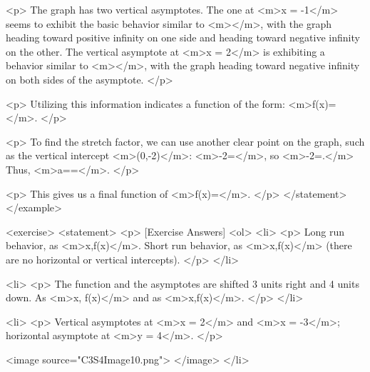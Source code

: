                 <p>
                    The graph has two vertical asymptotes.
                    The one at <m>x = -1</m> seems to exhibit the basic behavior similar to <m></m>, with the graph heading toward positive infinity on one side and heading toward negative infinity on the other.
                    The vertical asymptote at <m>x = 2</m> is exhibiting a behavior similar to <m></m>, with the graph heading toward negative infinity on both sides of the asymptote.
                </p>

                <p>
                    Utilizing this information indicates a function of the form: <m>f(x)=</m>.
                </p>

                <p>
                    To find the stretch factor, we can use another clear point on the graph, such as the vertical intercept <m>(0,-2)</m>: <m>-2=</m>, so <m>-2=.</m> Thus, <m>a==</m>.
                </p>

                <p>
                    This gives us a final function of <m>f(x)=</m>.
                </p>
            </statement>
        </example>

        <exercise>
            <statement>
                <p>
                    [Exercise Answers]
                    <ol>
                        <li>
                            <p>
                                Long run behavior, as <m>x\to \pm \infty,f(x)</m>.
                                Short run behavior, as <m>x,f(x)\to \infty</m> (there are no horizontal or vertical intercepts).
                            </p>
                        </li>

                        <li>
                            <p>
                                The function and the asymptotes are shifted 3 units right and 4 units down.
                                As <m>x, f(x)\to \infty</m> and as <m>x\to \pm \infty,f(x)</m>.
                            </p>
                        </li>

                        <li>
                            <p>
                                Vertical asymptotes at <m>x = 2</m> and <m>x = -3</m>; horizontal asymptote at <m>y = 4</m>.
                            </p>

                            <image source="C3S4Image10.png">
                            </image>
                        </li>

